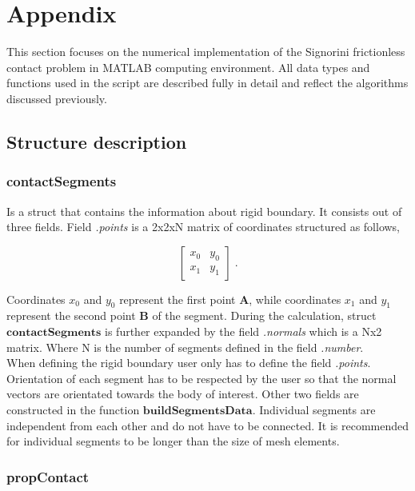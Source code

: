 \documentclass[10pt,a4paper]{article}
\begin{document}
\section{Appendix}

This section focuses on the numerical implementation of the Signorini frictionless contact problem in MATLAB computing environment. All data types and functions used in the script are described fully in detail and reflect the algorithms discussed previously. 

\subsection{Structure description}


\subsubsection{contactSegments} 

Is a struct that contains the information about rigid boundary. It consists out of three fields. Field \textit{.points} is a 2x2xN matrix of coordinates structured as follows,

\begin{equation}
	\left[ \begin{array}{cc}
		x_0 & y_0\\
		x_1 & y_1
    \end{array}	 \right] \;. \label{eq:segments_struct}
\end{equation}

Coordinates $x_0$ and $y_0$ represent the first point $\mathbf{A}$, while coordinates $x_1$ and $y_1$ represent the second point $\mathbf{B}$ of the segment. During the calculation, struct $\textbf{contactSegments}$ is further expanded by the field \textit{.normals} which is a Nx2 matrix. Where N is the number of segments defined in the field \textit{.number}.\\

When defining the rigid boundary user only has to define the field \textit{.points}. Orientation of each segment has to be respected by the user so that the normal vectors are orientated towards the body of interest. Other two fields are constructed in the function $\textbf{buildSegmentsData}$. Individual segments are independent from each other and do not have to be connected. It is recommended for individual segments to be longer than the size of mesh elements.


\subsubsection{propContact}
\end{document}
